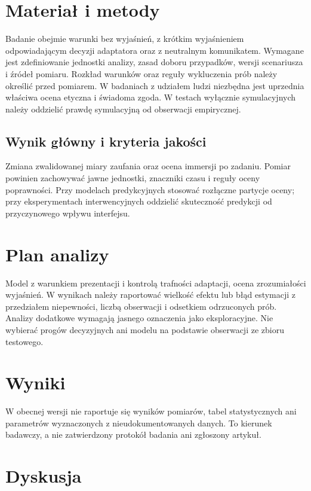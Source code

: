 \documentclass[11pt,a4paper]{article}
\begin{document}
\section{Materiał i metody}

Badanie obejmie warunki bez wyjaśnień, z krótkim wyjaśnieniem odpowiadającym decyzji adaptatora oraz z neutralnym komunikatem. Wymagane jest zdefiniowanie jednostki analizy, zasad doboru przypadków, wersji scenariusza i źródeł pomiaru. Rozkład warunków oraz reguły wykluczenia prób należy określić przed pomiarem. W badaniach z udziałem ludzi niezbędna jest uprzednia właściwa ocena etyczna i świadoma zgoda. W testach wyłącznie symulacyjnych należy oddzielić prawdę symulacyjną od obserwacji empirycznej.

\subsection{Wynik główny i kryteria jakości}

Zmiana zwalidowanej miary zaufania oraz ocena immersji po zadaniu. Pomiar powinien zachowywać jawne jednostki, znaczniki czasu i reguły oceny poprawności. Przy modelach predykcyjnych stosować rozłączne partycje oceny; przy eksperymentach interwencyjnych oddzielić skuteczność predykcji od przyczynowego wpływu interfejsu.

\section{Plan analizy}

Model z warunkiem prezentacji i kontrolą trafności adaptacji, ocena zrozumiałości wyjaśnień. W wynikach należy raportować wielkość efektu lub błąd estymacji z przedziałem niepewności, liczbą obserwacji i odsetkiem odrzuconych prób. Analizy dodatkowe wymagają jasnego oznaczenia jako eksploracyjne. Nie wybierać progów decyzyjnych ani modelu na podstawie obserwacji ze zbioru testowego.

\section{Wyniki}

W obecnej wersji nie raportuje się wyników pomiarów, tabel statystycznych ani parametrów wyznaczonych z nieudokumentowanych danych. To kierunek badawczy, a nie zatwierdzony protokół badania ani zgłoszony artykuł.

\section{Dyskusja}
\end{document}
